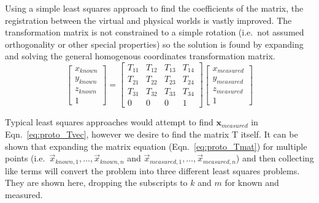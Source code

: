 Using a simple least squares approach to find the coefficients of the matrix, the registration between the virtual and physical worlds is vastly improved.
The transformation matrix is not constrained to a simple rotation (i.e.\ not assumed orthogonality or other special properties) so the solution is found by expanding and solving the general homogenous coordinates transformation matrix.
\begin{equation}
    \begin{bmatrix}
        x_{known} \\
        y_{known} \\
        z_{known} \\
        1
    \end{bmatrix} =
    \begin{bmatrix}
        T_{11} & T_{12} & T_{13} &T_{14} \\
        T_{21} & T_{22} & T_{23} &T_{24} \\
        T_{31} & T_{32} & T_{33} &T_{34} \\
        0 & 0 & 0 & 1
    \end{bmatrix}
    \begin{bmatrix}
        x_{measured} \\
        y_{measured} \\
        z_{measured} \\
        1
    \end{bmatrix}
    \label{eq:proto_Tmat}
\end{equation}

Typical least squares approaches would attempt to find $\mathbf{x}_{measured}$ in Eqn.\ \ref{eq:proto_Tvec}, however we desire to find the matrix T itself.
It can be shown that expanding the matrix equation (Eqn.\ \ref{eq:proto_Tmat}) for multiple points (i.e.\ $\vec{x}_{known,1},\dots,\vec{x}_{known,n}$ and $\vec{x}_{measured,1},\dots,\vec{x}_{measured,n}$) and then collecting like terms will convert the problem into three different least squares problems.
They are shown here, dropping the subscripts to $k$ and $m$ for known and measured.

